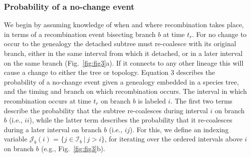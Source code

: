 \documentclass[11pt]{article}
\begin{document}
\subsubsection{Probability of a no-change event}
We begin by assuming knowledge of when and where recombination takes place, in terms 
of a recombination event bisecting branch $b$ at time $t_r$. %
For no change to occur to the genealogy the detached subtree must re-coalesce with 
its original branch, either in the same interval from which it detached, or in a
later interval on the same branch (Fig.~\ref{fig:fig3}a). %
If it connects to any other lineage this will cause a change to either the tree 
or topology. 
Equation 3 describes the probability of a no-change event 
given a genealogy embedded in a species tree, and the timing and branch on 
which recombination occurs. The interval in which recombination occurs at 
time $t_r$ on branch $b$ is labeled $i$. 
The first two terms describe the probability that the subtree re-coalesces 
during interval $i$ on branch $b$ (i.e., $ii$), 
while the latter term describes the probability that it re-coalesces 
during a later interval on branch $b$ (i.e., $ij$). For this, we define 
an indexing variable $\mathcal{J}_b(i)$ = $\{j \in \mathcal{I}_b ~|~ j > i\}$, 
for iterating over the ordered intervals above $i$ on branch $b$ (e.g., Fig.~\ref{fig:fig3}b).
\end{document}

